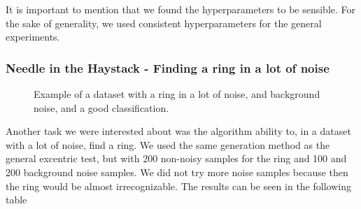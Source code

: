 \documentclass[conference]{IEEEtran}
\begin{document}
It is important to mention that we found the hyperparameters to be sensible. For the sake of generality, we used consistent hyperparameters for the general experiments.


\subsubsection{Needle in the Haystack - Finding a ring in a lot of noise}

\begin{figure}[H]
    \centering
    \resizebox{0.9\linewidth}{!}{}
    \label{fig:needle}
    \caption{Example of a dataset with a ring in a lot of noise, and background noise, and a good classification.}
\end{figure}

Another task we were interested about was the algorithm ability to, in a dataset with a lot of noise, find a ring. We used the same generation method as the general excentric test,
but with 200 non-noisy samples for the ring and 100 and 200 background noise samples. We did not try more noise samples because then the ring would be almost irrecognizable.
The results can be seen in the following table






\vspace{12pt}
\color{red}
\end{document}
